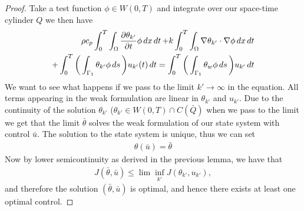 \begin{proof}
Take a test function $\phi \in W(0,T)$ and integrate over our space-time cylinder $Q$ we then have 
\begin{align*}
    \rho c_p \int_0^T\int_{\Omega}\frac{\partial \theta_{k'}}{\partial t}\phi \mathop{dx}\mathop{dt} + k \int_0^T \int_{\Omega}\nabla \theta_{k'} \cdot \nabla \phi \mathop{dx}\mathop{dt} \\ + \int_0^T \bigg (\int_{\Gamma_1}\theta_{k'}\phi \mathop{ds} \bigg )u_{k'}(t) \mathop{dt} =
    \int_0^T \bigg (\int_{\Gamma_1}\theta_w\phi \mathop{ds} \bigg ) u_{k'} \mathop{dt} 
\end{align*}
We want to see what happens if we pass to the limit $k' \rightarrow \infty$ in the equation. All terms appearing in the weak formulation are linear in $\theta_{k'}$ and $u_{k'}$. Due to the continuity of the solution $\theta_{k'}$ ($\theta_{k'} \in W(0,T) \cap C(\bar{Q})$ when we pass to the limit we get that the limit $\bar{\theta}$ solves the weak formulation of our state system with control $\bar{u}$. The solution to the state system is unique, thus we can set
\begin{align*}
    \theta(\bar{u}) = \bar{\theta} 
\end{align*}
Now by lower semicontinuity as derived in the previous lemma, we have that  
\begin{align*}
    J(\bar{\theta}, \bar{u}) \leq \lim \inf_{k'} J(\theta_{k'}, u_{k'}),
\end{align*}
and therefore the solution $(\bar{\theta}, \bar{u})$ is optimal, and hence there exists at least one optimal control.  
\end{proof}